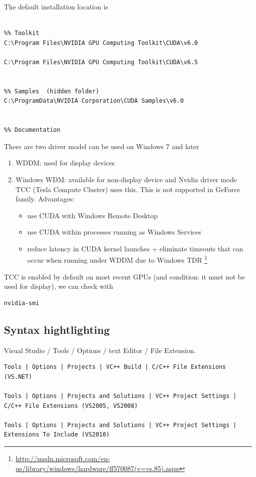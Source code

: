 The default installation location is
\begin{verbatim}

%% Toolkit
C:\Program Files\NVIDIA GPU Computing Toolkit\CUDA\v6.0

C:\Program Files\NVIDIA GPU Computing Toolkit\CUDA\v6.5


%% Samples  (hidden folder)
C:\ProgramData\NVIDIA Corporation\CUDA Samples\v6.0


%% Documentation

\end{verbatim}

There are two driver model can be used on Windows 7 and later
\begin{enumerate}
  \item WDDM: used for display devices
  \item Windows WDM: available for non-display device and Nvidia driver mode TCC
  (Tesla Compute Cluster) uses this. This is not supported in GeForce family.
  Advantages:
  \begin{itemize}
    \item use CUDA with Windows Remote Desktop
    \item use CUDA within processes running as Windows Services
    \item reduce latency in CUDA kernel launches + eliminate timeouts that can
    occur when running under WDDM due to Windows TDR
    \footnote{\url{http://msdn.microsoft.com/en-us/library/windows/hardware/ff570087(v=vs.85).aspx}}
  \end{itemize}
\end{enumerate}
TCC is enabled by default on most recent GPUs (and condition: it must not be
used for display), we can check with
\begin{verbatim}
nvidia-smi
\end{verbatim}

\subsection{Syntax hightlighting}


Visual Studio / Tools / Options / text Editor / File Extension.
\begin{verbatim}
Tools | Options | Projects | VC++ Build | C/C++ File Extensions (VS.NET)

Tools | Options | Projects and Solutions | VC++ Project Settings | C/C++ File Extensions (VS2005, VS2008)

Tools | Options | Projects and Solutions | VC++ Project Settings | Extensions To Include (VS2010)
\end{verbatim}

